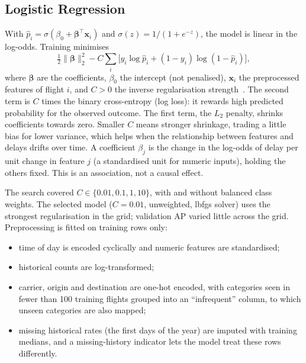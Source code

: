 \documentclass[conference]{IEEEtran}
\begin{document}
\subsection{Logistic Regression}
With $\hat{p}_i = \sigma(\beta_0 + \boldsymbol{\beta}^{\top}\mathbf{x}_i)$ and
$\sigma(z) = 1/(1+e^{-z})$, the model is linear in the log-odds. Training minimises
\begin{equation}
\tfrac{1}{2}\lVert\boldsymbol{\beta}\rVert_2^2
- C\sum_{i}\big[y_i\log\hat{p}_i + (1-y_i)\log(1-\hat{p}_i)\big],
\end{equation}
where $\boldsymbol{\beta}$ are the coefficients, $\beta_0$ the intercept (not penalised),
$\mathbf{x}_i$ the preprocessed features of flight $i$, and $C>0$ the inverse regularisation
strength~\cite{hastie2009}. The second term is $C$ times the binary cross-entropy (log loss): it
rewards high predicted probability for the observed outcome. The first term, the $L_2$ penalty,
shrinks coefficients towards zero. Smaller $C$ means stronger shrinkage, trading a little bias for
lower variance, which helps when the relationship between features and delays drifts over time. A
coefficient $\beta_j$ is the change in the log-odds of delay per unit change in feature $j$ (a
standardised unit for numeric inputs), holding the others fixed. This is an association, not a
causal effect.

The search covered $C\in\{0.01,0.1,1,10\}$, with and without balanced class weights. The selected
model ($C=0.01$, unweighted, lbfgs solver) uses the strongest regularisation in the grid; validation
AP varied little across the grid. Preprocessing is fitted on training rows only:
\begin{itemize}
\item time of day is encoded cyclically and numeric features are standardised;
\item historical counts are log-transformed;
\item carrier, origin and destination are one-hot encoded, with categories seen in fewer than 100
training flights grouped into an ``infrequent'' column, to which unseen categories are also
mapped;
\item missing historical rates (the first days of the year) are imputed with training medians, and
a missing-history indicator lets the model treat these rows differently.
\end{itemize}
\end{document}

